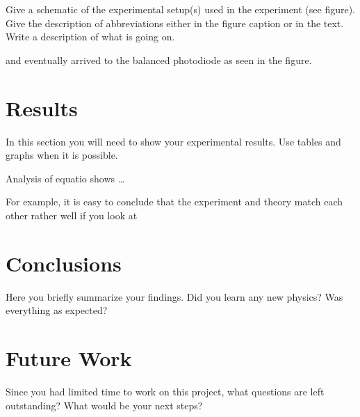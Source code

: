 Give a schematic of the experimental setup{(s)} used in the experiment (see
figure). Give the description of  abbreviations
either in the figure caption or in the text. Write a description of what is
going on.


and eventually arrived to the
balanced photodiode as seen in the figure.


\section{Results}

In this section you will need to show your experimental results. Use tables and
graphs when it is possible.


Analysis of equatio shows \ldots

\blindtext{}

For example, it is easy to conclude that the
experiment and theory match each other rather well if you look at


\section{Conclusions}
Here you briefly summarize your findings. Did you learn any new physics? Was everything as expected?

\blindtext{}

\section{Future Work}
Since you had limited time to work on this project, what questions are left outstanding? What would be your next steps?

